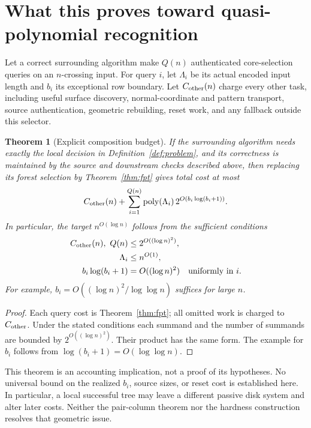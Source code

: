 \documentclass[11pt,letterpaper]{article}
\newtheorem{theorem}{Theorem}[section]
\theoremstyle{definition}
\theoremstyle{remark}
\DeclareMathOperator{\poly}{poly}
\begin{document}
\section{What this proves toward quasi-polynomial recognition}\label{sec:global}
Let a correct surrounding algorithm make $Q(n)$ authenticated core-selection
queries on an $n$-crossing input. For query $i$, let $\Lambda_i$ be its actual
encoded input length and $b_i$ its exceptional row boundary. Let $C_{\rm other}(n)$
charge every other task, including useful surface discovery, normal-coordinate
and pattern transport, source authentication, geometric rebuilding, reset work,
and any fallback outside this selector.

\begin{theorem}[Explicit composition budget]\label{thm:composition}
If the surrounding algorithm needs exactly the local decision in
Definition~\ref{def:problem}, and its correctness is maintained by the source
and downstream checks described above, then replacing its forest selection by
Theorem~\ref{thm:fpt} gives total cost at most
\begin{equation}\label{eq:global-budget}
 C_{\rm other}(n)+\sum_{i=1}^{Q(n)}
       \poly(\Lambda_i)\,2^{O(b_i\log(b_i+1))}.
\end{equation}
In particular, the target $n^{O(\log n)}$ follows from the sufficient conditions
\begin{align}
 C_{\rm other}(n),\ Q(n)&\le 2^{O((\log n)^2)},\label{eq:cond-other}\\
 \Lambda_i&\le n^{O(1)},\label{eq:cond-size}\\
 b_i\log(b_i+1)&=O((\log n)^2)\quad\text{uniformly in }i.\label{eq:cond-b}
\end{align}
For example, $b_i=O((\log n)^2/\log\log n)$ suffices for large $n$.
\end{theorem}
\begin{proof}
Each query cost is Theorem~\ref{thm:fpt}; all omitted work is charged to
$C_{\rm other}$. Under the stated conditions each summand and the number of
summands are bounded by $2^{O((\log n)^2)}$. Their product has the same form.
The example for $b_i$ follows from $\log(b_i+1)=O(\log\log n)$.
\end{proof}

This theorem is an accounting implication, not a proof of its hypotheses.
No universal bound on the realized $b_i$, source sizes, or reset cost is established
here. In particular, a local successful tree may leave a different passive disk
system and alter later costs. Neither the pair-column theorem nor the hardness
construction resolves that geometric issue.
\end{document}
